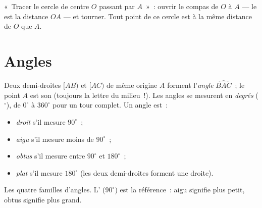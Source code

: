 \begin{example}\label{ex:g6:lines:circle}
«~Tracer le cercle de centre $O$ passant par $A$~»~: ouvrir le
compas de $O$ à $A$ --- le  est la distance $OA$ --- et tourner.
Tout point de ce cercle est à la même distance de $O$ que $A$.
\end{example}

\section{Angles}

\begin{definition}[Angle]\label{def:g6:lines:angle}
Deux demi-droites $[AB)$ et $[AC)$ de même origine $A$ forment
l'\emph{angle} $\widehat{BAC}$~; le point $A$ est son
\emph{} (toujours la lettre du milieu~!). Les angles se mesurent
en \emph{degrés} ($^\circ$), de $0^\circ$ à $360^\circ$ pour un tour
complet. Un angle est~:
\begin{itemize}
  \item \emph{droit} s'il mesure $90^\circ$~;
  \item \emph{aigu} s'il mesure moins de $90^\circ$~;
  \item \emph{obtus} s'il mesure entre $90^\circ$ et $180^\circ$~;
  \item \emph{plat} s'il mesure $180^\circ$ (les deux demi-droites
        forment une droite).
\end{itemize}
\end{definition}

\begin{omfigure}

{\small Les quatre familles d'angles. L' ($90^\circ$) est
la référence~: aigu signifie plus petit, obtus signifie plus grand.}
\end{omfigure}

